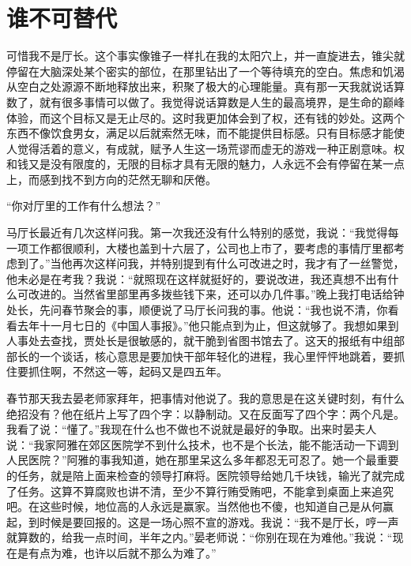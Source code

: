 \documentclass[12pt,oneside]{book}
\begin{document}
\chapter{谁不可替代}

可惜我不是厅长。这个事实像锥子一样扎在我的太阳穴上，并一直旋进去，锥尖就停留在大脑深处某个密实的部位，在那里钻出了一个等待填充的空白。焦虑和饥渴从空白之处源源不断地释放出来，积聚了极大的心理能量。真有那一天我就说话算数了，就有很多事情可以做了。我觉得说话算数是人生的最高境界，是生命的巅峰体验，而这个目标又是无止尽的。这时我更加体会到了权，还有钱的妙处。这两个东西不像饮食男女，满足以后就索然无味，而不能提供目标感。只有目标感才能使人觉得活着的意义，有成就，赋予人生这一场荒谬而虚无的游戏一种正剧意味。权和钱又是没有限度的，无限的目标才具有无限的魅力，人永远不会有停留在某一点上，而感到找不到方向的茫然无聊和厌倦。

``你对厅里的工作有什么想法？''

马厅长最近有几次这样问我。第一次我还没有什么特别的感觉，我说：``我觉得每一项工作都很顺利，大楼也盖到十六层了，公司也上市了，要考虑的事情厅里都考虑到了。''当他再次这样问我，并特别提到有什么可改进之时，我才有了一丝警觉，他未必是在考我？我说：``就照现在这样就挺好的，要说改进，我还真想不出有什么可改进的。当然省里部里再多拨些钱下来，还可以办几件事。''晚上我打电话给钟处长，先问春节聚会的事，顺便说了马厅长问我的事。他说：``我也说不清，你看看去年十一月七日的《中国人事报》。''他只能点到为止，但这就够了。我想如果到人事处去查找，贾处长是很敏感的，就干脆到省图书馆去了。这天的报纸有中组部部长的一个谈话，核心意思是要加快干部年轻化的进程，我心里怦怦地跳着，要抓住要抓住啊，不然这一等，起码又是四五年。

春节那天我去晏老师家拜年，把事情对他说了。我的意思是在这关键时刻，有什么绝招没有？他在纸片上写了四个字：以静制动。又在反面写了四个字：两个凡是。我看了说：``懂了。''我现在什么也不做也不说就是最好的争取。出来时晏夫人说：``我家阿雅在郊区医院学不到什么技术，也不是个长法，能不能活动一下调到人民医院？''阿雅的事我知道，她在那里呆这么多年都忍无可忍了。她一个最重要的任务，就是陪上面来检查的领导打麻将。医院领导给她几千块钱，输光了就完成了任务。这算不算腐败也讲不清，至少不算行贿受贿吧，不能拿到桌面上来追究吧。在这些时候，地位高的人永远是赢家。当然他也不傻，也知道自己是从何赢起，到时候是要回报的。这是一场心照不宣的游戏。我说：``我不是厅长，哼一声就算数的，给我一点时间，半年之内。''晏老师说：``你别在现在为难他。''我说：``现在是有点为难，也许以后就不那么为难了。''
\end{document}
